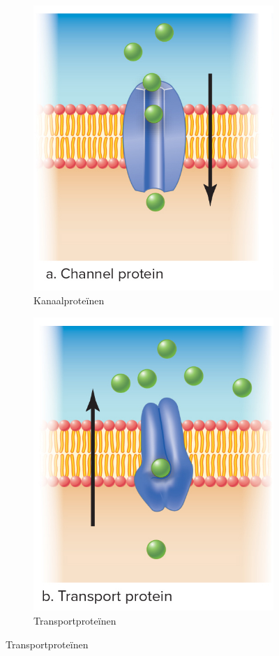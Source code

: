 \documentclass[a4paper,kul]{kulakarticle} %
\begin{document}
\begin{figure}[!htbp]
	\centering
	\begin{subfigure}{.5\textwidth}
		\centering
		\includegraphics[width=0.7\linewidth]{Kanaalprot}
		\caption{Kanaalproteïnen}
		\label{fig:kanaal}
	\end{subfigure}%
	\begin{subfigure}{.5\textwidth}
		\centering
		\includegraphics[width=0.7\linewidth]{transportprot}
		\caption{Transportproteïnen}
		\label{fig:transport}
	\end{subfigure}

\end{figure}
\end{document}
